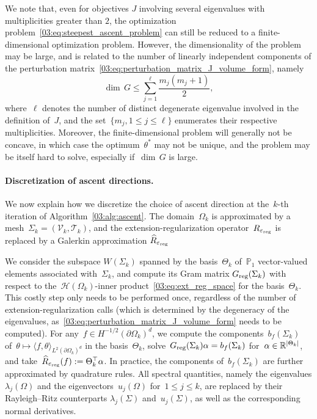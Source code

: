 \begin{remark}
    We note that, even for objectives $J$ involving several eigenvalues with multiplicities greater than $2$, the optimization problem~\eqref{03:eq:steepest_ascent_problem} can still be reduced to a finite-dimensional optimization problem.
    However, the dimensionality of the problem may be large, and is related to the number of linearly independent components of the perturbation matrix~\eqref{03:eq:perturbation_matrix_J_volume_form}, namely
    $$ \dim\,G \leq \sum_{j=1}^{\ell} \frac{m_j(m_j+1)}{2},$$
    where~$\ell$ denotes the number of distinct degenerate eigenvalue involved in the definition of~$J$, and the set~$\{m_j,1\leq j\leq \ell\}$ enumerates their respective multiplicities.
    Moreover, the finite-dimensional problem will generally not be concave, in which case the optimum~$\theta^*$ may not be unique, and the problem may be itself hard to solve, especially if~$\dim\, G$ is large.
\end{remark}

\paragraph{Discretization of ascent directions.}
We now explain how we discretize the choice of ascent direction at the~$k$-th iteration of Algorithm~\ref{03:alg:ascent}. The domain~$\Omega_k$ is approximated by a mesh~$\Sigma_k =(\mathcal V_k,\mathcal T_k)$, and the extension-regularization operator~$R_{\varepsilon_{\mathrm{reg}}}$ is replaced by a Galerkin approximation $\widehat{R}_{\varepsilon_{\mathrm{reg}}}$

We consider the subspace $W(\Sigma_k)$ spanned by the basis~$\Theta_k$ of~$\mathbb P_1$ vector-valued elements associated with~$\Sigma_k$, and compute its Gram matrix $G_{\mathrm{reg}}(\Sigma_k)$ with respect to the~$\mathcal H(\Omega_k)$-inner product~\eqref{03:eq:ext_reg_space} for the basis~$\Theta_k$. This costly step only needs to be performed once, regardless of the number of extension-regularization calls (which is determined by the degeneracy of the eigenvalues, as~\eqref{03:eq:perturbation_matrix_J_volume_form} needs to be computed).
For any~$f\in H^{-1/2}(\partial\Omega_k)^d$, we compute the components~$b_f(\Sigma_k)$ of~$\theta\mapsto\langle f,\theta\rangle_{L^2(\partial\Omega_k)^d}$ in the basis~$\Theta_k$, solve~$G_{\mathrm{reg}}(\Sigma_k)\alpha = b_f(\Sigma_k)$ for~$\alpha\in\mathbb{R}^{|\Theta_k|}$, and take~$\widehat{R}_{\varepsilon_{\mathrm{reg}}}(f):=\Theta_k^\top\alpha$. In practice, the components of~$b_f(\Sigma_k)$ are further approximated by quadrature rules.
All spectral quantities, namely the eigenvalues $\lambda_j(\Omega)$ and the eigenvectors~$u_j(\Omega)$ for~$1\leq j\leq k$, are replaced by their Rayleigh--Ritz counterparts $\lambda_j(\Sigma)$ and~$u_j(\Sigma)$, as well as the corresponding normal derivatives.

